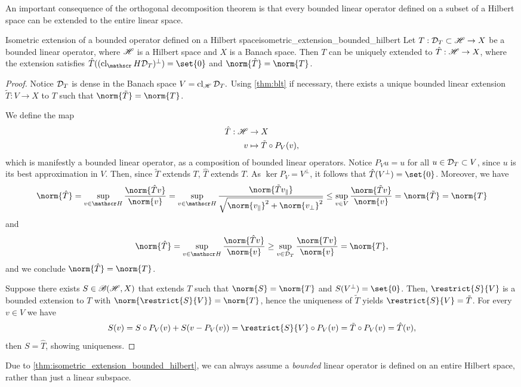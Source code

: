An important consequence of the orthogonal decomposition theorem is that every bounded linear operator defined on a subset of a Hilbert space can be extended to the entire linear space.
\begin{theorem}{Isometric extension of a bounded operator defined on a Hilbert space}{isometric_extension_bounded_hilbert}
    Let \(T : \mathcal{D}_{T} \subset \mathscr{H} \to X\) be a bounded linear operator, where \(\mathscr{H}\) is a Hilbert space and \(X\) is a Banach space. Then \(T\) can be uniquely extended to \(\hat{T} : \mathscr{H} \to X\), where the extension satisfies \(\hat{T}((\cl_\hilbert\domain{T})^\perp) = \set{0}\) and \(\norm{\hat{T}} = \norm{T}\).
\end{theorem}
\begin{proof}
    Notice \(\mathcal{D}_{T}\) is dense in the Banach space \(V = \operatorname{cl}_{\mathscr{H}}{\mathcal{D}_{T}}.\) Using \cref{thm:blt} if necessary, there exists a unique bounded linear extension \(\tilde{T} : V \to X\) to \(T\) such that \(\norm{\tilde{T}} = \norm{T}\).

    We define the map
    \begin{align*}
        \hat{T} : \mathscr{H} &\to X\\
                         v &\mapsto \tilde{T} \circ P_V (v),
    \end{align*}
    which is manifestly a bounded linear operator, as a composition of bounded linear operators. Notice \(P_Vu = u\) for all \(u \in \mathcal{D}_{T}\subset V\), since \(u\) is its best approximation in \(V\). Then, since \(\tilde{T}\) extends \(T\), \(\hat{T}\) extends \(T\). As \(\ker{P_V} = V^\perp\), it follows that \(\hat{T}(V^\perp) = \set{0}\). Moreover, we have
    \begin{equation*}
        \norm{\hat{T}} = \sup_{v \in \hilbert}{\frac{\norm{\hat{T}v}}{\norm{v}}}= \sup_{v \in \hilbert}{\frac{\norm{\tilde{T}v_\parallel}}{\sqrt{\norm{v_\parallel}^2 + \norm{v_\perp}^2}}} \leq \sup_{v\in V}{\frac{\norm{\tilde{T}v}}{\norm{v}}} = \norm{\tilde{T}} = \norm{T}
    \end{equation*}
    and
    \begin{equation*}
        \norm{\hat{T}} = \sup_{v \in \hilbert}{\frac{\norm{\hat{T}v}}{\norm{v}}} \geq \sup_{v\in\domain{T}}{\frac{\norm{Tv}}{\norm{v}}} = \norm{T},
    \end{equation*}
    and we conclude \(\norm{\hat{T}} = \norm{T}\).

    Suppose there exists \(S \in \mathscr{B}(\mathscr{H}, X)\) that extends \(T\) such that \(\norm{S} = \norm{T}\) and \(S(V^\perp) = \set{0}\). Then, \(\restrict{S}{V}\) is a bounded extension to \(T\) with \(\norm{\restrict{S}{V}} = \norm{T}\), hence the uniqueness of \(\tilde{T}\) yields \(\restrict{S}{V} = \tilde{T}\). For every \(v \in V\) we have
    \begin{equation*}
        S(v) = S\circ P_V(v) + S(v - P_V(v)) = \restrict{S}{V} \circ P_V(v) = \tilde{T}\circ P_V (v) = \hat{T}(v),
    \end{equation*}
    then \(S = \hat{T}\), showing uniqueness.
\end{proof}
Due to \cref{thm:isometric_extension_bounded_hilbert}, we can always assume a \emph{bounded} linear operator is defined on an entire Hilbert space, rather than just a linear subspace.

